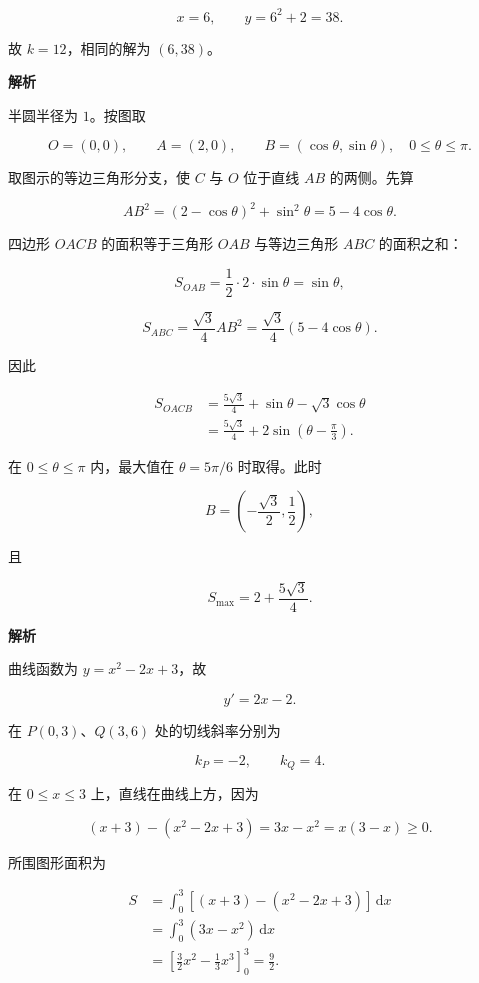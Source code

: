 \begin{answer}
\nopagebreak[4]
\[
x=6,\qquad y=6^2+2=38.
\]

故 $k=12$，相同的解为 $(6,38)$。


\textbf{解析}

半圆半径为 $1$。按图取

\nopagebreak[4]
\[
O=(0,0),\qquad A=(2,0),\qquad B=(\cos\theta,\sin\theta),
\quad 0\leqslant\theta\leqslant\pi.
\]

取图示的等边三角形分支，使 $C$ 与 $O$ 位于直线 $AB$ 的两侧。先算

\nopagebreak[4]
\[
AB^2=(2-\cos\theta)^2+\sin^2\theta=5-4\cos\theta.
\]

四边形 $OACB$ 的面积等于三角形 $OAB$ 与等边三角形 $ABC$ 的面积之和：

\nopagebreak[4]
\[
S_{OAB}=\frac12\cdot2\cdot\sin\theta=\sin\theta,
\]

\nopagebreak[4]
\[
S_{ABC}=\frac{\sqrt3}{4}AB^2=\frac{\sqrt3}{4}(5-4\cos\theta).
\]

因此

\nopagebreak[4]
\[
\begin{aligned}
S_{OACB}
&=\frac{5\sqrt3}{4}+\sin\theta-\sqrt3\cos\theta\\
&=\frac{5\sqrt3}{4}+2\sin\left(\theta-\frac\pi3\right).
\end{aligned}
\]

在 $0\leqslant\theta\leqslant\pi$ 内，最大值在 $\theta=5\pi/6$ 时取得。此时

\nopagebreak[4]
\[
B=\left(-\frac{\sqrt3}{2},\frac12\right),
\]

且

\nopagebreak[4]
\[
S_{\max}=2+\frac{5\sqrt3}{4}.
\]


\textbf{解析}

曲线函数为 $y=x^2-2x+3$，故

\nopagebreak[4]
\[
y'=2x-2.
\]

在 $P(0,3)$、$Q(3,6)$ 处的切线斜率分别为

\nopagebreak[4]
\[
k_P=-2,\qquad k_Q=4.
\]

在 $0\leqslant x\leqslant3$ 上，直线在曲线上方，因为

\nopagebreak[4]
\[
(x+3)-(x^2-2x+3)=3x-x^2=x(3-x)\geqslant0.
\]

所围图形面积为

\nopagebreak[4]
\[
\begin{aligned}
S&=\int_0^3\left[(x+3)-(x^2-2x+3)\right]\,\mathrm dx\\
&=\int_0^3(3x-x^2)\,\mathrm dx\\
&=\left[\frac32x^2-\frac13x^3\right]_0^3=\frac92.
\end{aligned}
\]


\end{answer}